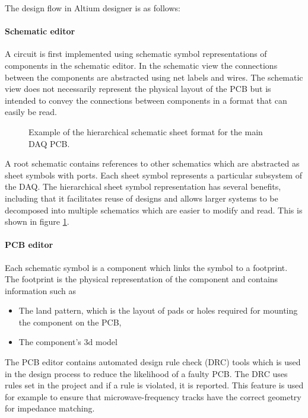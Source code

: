 \documentclass[a4paper,11pt]{article}
\begin{document}
The design flow in Altium designer is as follows:
\paragraph{Schematic editor}
A circuit is first implemented using schematic symbol representations of components in the schematic editor. In the schematic view the connections between the components are abstracted using net labels and wires. The schematic view does not necessarily represent the physical layout of the PCB but is intended to convey the connections between components in a format that can easily be read.



\begin{figure}[H]
  \centering
  
  \caption{Example of the hierarchical schematic sheet format for the main DAQ PCB.}
  \label{fig:altium-schematic-hierarchical}
\end{figure}

A root schematic contains references to other schematics which are abstracted as sheet symbols with ports. Each sheet symbol represents a particular subsystem of the DAQ. The hierarchical sheet symbol representation has several benefits, including that it facilitates reuse of designs and allows larger systems to be decomposed into multiple schematics which are easier to modify and read. This is shown in figure \ref{fig:altium-schematic-hierarchical}.


\paragraph{PCB editor}
Each schematic symbol is a component which links the symbol to a footprint. The footprint is the physical representation of the component and contains information such as
\begin{itemize}
  \item The land pattern, which is the layout of pads or holes required for mounting the component on the PCB,
  \item The component's 3d model
\end{itemize}

The PCB editor contains automated design rule check (DRC) tools which is used in the design process to reduce the likelihood of a faulty PCB. The DRC uses rules set in the project and if a rule is violated, it is reported. This feature is used for example to ensure that microwave-frequency tracks have the correct geometry for impedance matching.
\end{document}
